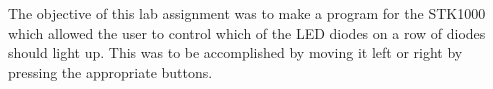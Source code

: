 The objective of this lab assignment was to make a program for the STK1000 which allowed the user to control which of the LED diodes on a row of diodes should light up.
This was to be accomplished by moving it left or right by pressing the appropriate buttons.
